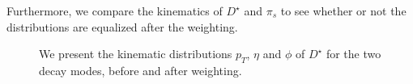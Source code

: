 \documentclass{article}
\begin{document}
    Furthermore, we compare the kinematics of $D^\star$ and $\pi_s$ to see whether or not the distributions are equalized after the weighting.

    \begin{figure}[h!]
        \centering
        \hfill
        \caption{We present the kinematic distributions $p_T$, $\eta$ and $\phi$ of $D^\star$ for the two decay modes, before and after weighting.}
    \end{figure}
\end{document}
